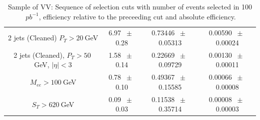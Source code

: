 \begin{table}[htbp]
\begin{center}
\begin{tabular}{|c|c|c|c|}
          2 jets (Cleaned) $P_T>20~$GeV          &           6.97          $~\pm~$          0.28           &           0.73446          $~\pm~$          0.05313           &           0.00590          $~\pm~$          0.00024          \\          
          2 jets (Cleaned), $P_T>50~$GeV, $ | \eta |<3$          &           1.58          $~\pm~$          0.14           &           0.22669          $~\pm~$          0.09729           &           0.00130          $~\pm~$          0.00011          \\          
          $M_{ee}>100~$GeV          &           0.78          $~\pm~$          0.10           &           0.49367          $~\pm~$          0.15585           &           0.00066          $~\pm~$          0.00008          \\          
          $ S_T>620~$GeV           &           0.09          $~\pm~$          0.03           &           0.11538          $~\pm~$          0.35714           &           0.00008          $~\pm~$          0.00003          \\          
          \hline\hline 
\end{tabular} 
\end{center} 
\caption{Sample of VV: Sequence of selection cuts with number of events selected in 100$~pb^{-1}$, efficiency relative to the preceeding cut and absolute efficiency.} 
\label{tab:} 
\end{table} 

